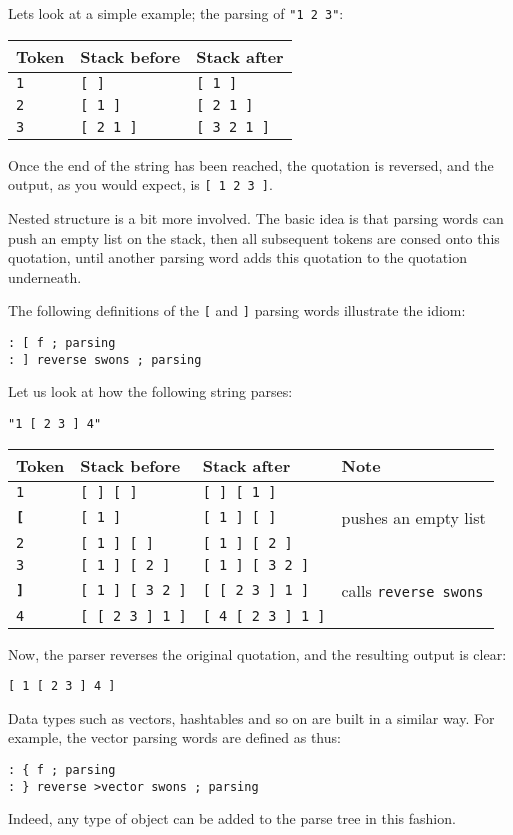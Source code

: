 \documentclass{book}
\begin{document}
Lets look at a simple example; the parsing of \texttt{"1 2 3"}:

\begin{tabular}{l|l|l}
\hline
Token&Stack before&Stack after\\
\hline
\verb|1|&\verb|[ ]|&\verb|[ 1 ]|\\
\verb|2|&\verb|[ 1 ]|&\verb|[ 2 1 ]|\\
\verb|3|&\verb|[ 2 1 ]|&\verb|[ 3 2 1 ]|
\end{tabular}

Once the end of the string has been reached, the quotation is reversed, and the output, as you would expect, is \verb|[ 1 2 3 ]|.

Nested structure is a bit more involved. The basic idea is that parsing words can push an empty list on the stack, then all subsequent tokens are consed onto this quotation, until another parsing word adds this quotation to the quotation underneath.

The following definitions of the \verb|[| and \verb|]| parsing words illustrate the idiom:
\begin{verbatim}
: [ f ; parsing
: ] reverse swons ; parsing
\end{verbatim}

Let us look at how the following string parses:

\begin{verbatim}
"1 [ 2 3 ] 4"
\end{verbatim}

\begin{tabular}{l|l|l|l}
\hline
Token&Stack before&Stack after&Note\\
\hline
\verb|1|&\verb|[ ] [ ]|&\verb|[ ] [ 1 ]|&\\
\textbf{\texttt{[}}&\verb|[ 1 ]|&\verb|[ 1 ] [ ]|&pushes an empty list\\
\verb|2|&\verb|[ 1 ] [ ]|&\verb|[ 1 ] [ 2 ]|&\\
\verb|3|&\verb|[ 1 ] [ 2 ]|&\verb|[ 1 ] [ 3 2 ]|&\\
\textbf{\texttt{]}}&\verb|[ 1 ] [ 3 2 ]|&\verb|[ [ 2 3 ] 1 ]|&calls \verb|reverse swons|\\
\verb|4|&\verb|[ [ 2 3 ] 1 ]|&\verb|[ 4 [ 2 3 ] 1 ]|&
\end{tabular}

Now, the parser reverses the original quotation, and the resulting output is clear:
\begin{verbatim}
[ 1 [ 2 3 ] 4 ]
\end{verbatim}
Data types such as vectors, hashtables and so on are built in a similar way. For example, the vector parsing words are defined as thus:
\begin{verbatim}
: { f ; parsing
: } reverse >vector swons ; parsing
\end{verbatim}
Indeed, any type of object can be added to the parse tree in this fashion.
\end{document}
